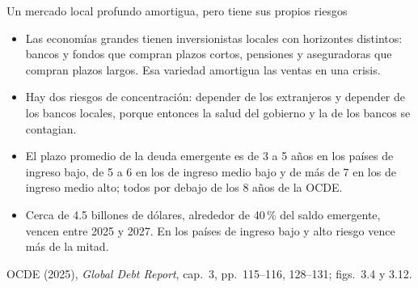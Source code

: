 \documentclass[aspectratio=169,11pt]{beamer}
\newcommand{\fuente}[1]{\par\vfill{\small\color{cGris}#1\par}}
\newcommand{\GDR}{OCDE (2025), \emph{Global Debt Report}}
\begin{document}
\begin{frame}{Un mercado local profundo amortigua, pero tiene sus propios riesgos}
  \small
  \begin{itemize}
    \item<1-> Las economías grandes tienen inversionistas locales con horizontes distintos: bancos y fondos que compran plazos cortos, pensiones y aseguradoras que compran plazos largos. Esa variedad amortigua las ventas en una crisis.
    \item<2-> Hay dos riesgos de concentración: depender de los extranjeros y depender de los bancos locales, porque entonces la salud del gobierno y la de los bancos se contagian.
    \item<3-> El plazo promedio de la deuda emergente es de 3 a 5 años en los países de ingreso bajo, de 5 a 6 en los de ingreso medio bajo y de más de 7 en los de ingreso medio alto; todos por debajo de los 8 años de la OCDE.
    \item<4-> Cerca de 4.5 billones de dólares, alrededor de 40\,\% del saldo emergente, vencen entre 2025 y 2027. En los países de ingreso bajo y alto riesgo vence más de la mitad.
  \end{itemize}
  \fuente{\GDR, cap.~3, pp.~115--116, 128--131; figs.~3.4 y 3.12.}
\end{frame}
\end{document}
